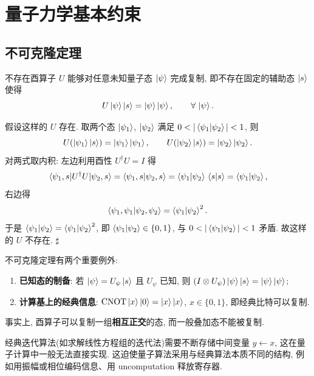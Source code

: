 \documentclass[utf8]{article} %
\numberwithin{equation}{section}   %
\newtheorem{Thm}{\hskip 2em {\color{blue} 定理}}[subsection]
\newtheorem{Note}{\hskip 2em {\color{red} 注}}[subsection]
\newenvironment{Proof}{{\noindent\it Proof:}\quad}{\hfill $\sharp $\par}
\begin{document}
\section{量子力学基本约束} \label{sec:constraints}

\subsection{不可克隆定理}

\begin{Thm}
    不存在酉算子 $U$ 能够对任意未知量子态 $\ket{\psi}$ 完成复制, 即不存在固定的辅助态 $\ket{s}$ 使得
    \begin{equation}
        U \ket{\psi}\ket{s} = \ket{\psi}\ket{\psi}, \qquad \forall\, \ket{\psi}.
    \end{equation}
\end{Thm}

\begin{Proof}
    假设这样的 $U$ 存在. 取两个态 $\ket{\psi_1}$, $\ket{\psi_2}$ 满足 $0 < |\braket{\psi_1}{\psi_2}| < 1$, 则
    \[ U(\ket{\psi_1}\ket{s}) = \ket{\psi_1}\ket{\psi_1}, \qquad U(\ket{\psi_2}\ket{s}) = \ket{\psi_2}\ket{\psi_2}. \]
    对两式取内积: 左边利用酉性 $U^\dagger U = I$ 得
    \[
        \mel{\psi_1, s}{U^\dagger U}{\psi_2, s}=\braket{\psi_1, s}{\psi_2, s} = \braket{\psi_1}{\psi_2}\,\braket{s}{s} = \braket{\psi_1}{\psi_2},
    \]
    右边得
    \[
        \braket{\psi_1, \psi_1}{\psi_2, \psi_2} = \braket{\psi_1}{\psi_2}^2.
    \]
    于是 $\braket{\psi_1}{\psi_2} = \braket{\psi_1}{\psi_2}^2$, 即 $\braket{\psi_1}{\psi_2} \in \{0, 1\}$,
    与 $0 < |\braket{\psi_1}{\psi_2}| < 1$ 矛盾. 故这样的 $U$ 不存在.
\end{Proof}

\begin{Note}[两个例外]
    不可克隆定理有两个重要例外:
    \begin{enumerate}
        \item \textbf{已知态的制备}: 若 $\ket{\psi} = U_\psi \ket{s}$ 且 $U_\psi$ 已知, 则
        $(I \otimes U_\psi)\ket{\psi}\ket{s} = \ket{\psi}\ket{\psi}$;
        \item \textbf{计算基上的经典信息}: $\text{CNOT}\ket{x}\ket{0} = \ket{x}\ket{x}$,
        $x \in \{0,1\}$, 即经典比特可以复制.
    \end{enumerate}
    事实上, 酉算子可以复制一组\textbf{相互正交}的态, 而一般叠加态不能被复制.
\end{Note}

\begin{Note}[对科学计算的启示]
    经典迭代算法(如求解线性方程组的迭代法)需要不断存储中间变量 $y \leftarrow x$,
    这在量子计算中一般无法直接实现. 这迫使量子算法采用与经典算法本质不同的结构,
    例如用振幅或相位编码信息、用 uncomputation 释放寄存器.
\end{Note}
\end{document}

